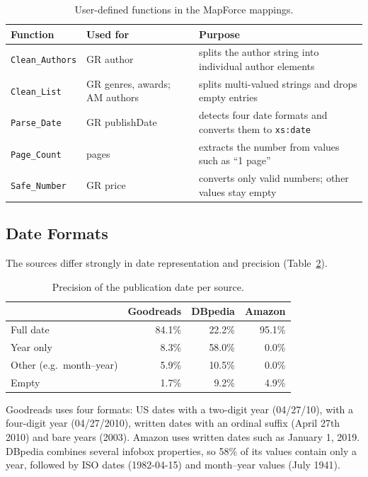 \documentclass[runningheads]{llncs}
\begin{document}
\begin{table}[htbp]
\centering
\caption{User-defined functions in the MapForce mappings.}
\label{tab:udf}
\footnotesize
\begin{tabularx}{\textwidth}{@{}l l >{\RaggedRight\arraybackslash}X@{}}
\toprule
\textbf{Function} & \textbf{Used for} & \textbf{Purpose} \\
\midrule
\texttt{Clean\_Authors} & GR author & splits the author string into individual author elements \\
\texttt{Clean\_List} & GR genres, awards; AM authors & splits multi-valued strings and drops empty entries \\
\texttt{Parse\_Date} & GR publishDate & detects four date formats and converts them to \texttt{xs:date} \\
\texttt{Page\_Count} & pages & extracts the number from values such as ``1 page'' \\
\texttt{Safe\_Number} & GR price & converts only valid numbers; other values stay empty \\
\bottomrule
\end{tabularx}
\end{table}

\subsection{Date Formats}
The sources differ strongly in date representation and precision
(Table~\ref{tab:dates}).

\begin{table}[htbp]
\centering
\caption{Precision of the publication date per source.}
\label{tab:dates}
\footnotesize
\begin{tabular}{lrrr}
\toprule
 & \textbf{Goodreads} & \textbf{DBpedia} & \textbf{Amazon} \\
\midrule
Full date               & 84.1\% & 22.2\% & 95.1\% \\
Year only               &  8.3\% & 58.0\% &  0.0\% \\
Other (e.g.\ month--year) & 5.9\% & 10.5\% & 0.0\% \\
Empty                   &  1.7\% &  9.2\% &  4.9\% \\
\bottomrule
\end{tabular}
\end{table}

Goodreads uses four formats: US dates with a two-digit year (04/27/10), with a
four-digit year (04/27/2010), written dates with an ordinal suffix (April 27th
2010) and bare years (2003). Amazon uses written dates such as January 1,
2019. DBpedia combines several infobox properties, so 58\% of its values
contain only a year, followed by ISO dates (1982-04-15) and month--year values
(July 1941).
\end{document}
